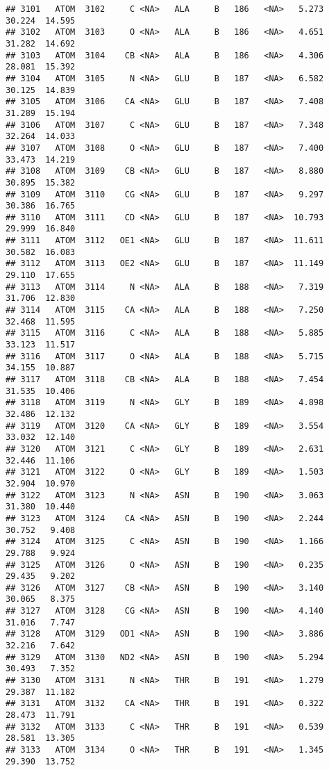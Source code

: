 \documentclass[
]{article}
\begin{document}
\begin{verbatim}
## 3101   ATOM  3102     C <NA>   ALA     B   186   <NA>   5.273  30.224  14.595
## 3102   ATOM  3103     O <NA>   ALA     B   186   <NA>   4.651  31.282  14.692
## 3103   ATOM  3104    CB <NA>   ALA     B   186   <NA>   4.306  28.081  15.392
## 3104   ATOM  3105     N <NA>   GLU     B   187   <NA>   6.582  30.125  14.839
## 3105   ATOM  3106    CA <NA>   GLU     B   187   <NA>   7.408  31.289  15.194
## 3106   ATOM  3107     C <NA>   GLU     B   187   <NA>   7.348  32.264  14.033
## 3107   ATOM  3108     O <NA>   GLU     B   187   <NA>   7.400  33.473  14.219
## 3108   ATOM  3109    CB <NA>   GLU     B   187   <NA>   8.880  30.895  15.382
## 3109   ATOM  3110    CG <NA>   GLU     B   187   <NA>   9.297  30.386  16.765
## 3110   ATOM  3111    CD <NA>   GLU     B   187   <NA>  10.793  29.999  16.840
## 3111   ATOM  3112   OE1 <NA>   GLU     B   187   <NA>  11.611  30.582  16.083
## 3112   ATOM  3113   OE2 <NA>   GLU     B   187   <NA>  11.149  29.110  17.655
## 3113   ATOM  3114     N <NA>   ALA     B   188   <NA>   7.319  31.706  12.830
## 3114   ATOM  3115    CA <NA>   ALA     B   188   <NA>   7.250  32.468  11.595
## 3115   ATOM  3116     C <NA>   ALA     B   188   <NA>   5.885  33.123  11.517
## 3116   ATOM  3117     O <NA>   ALA     B   188   <NA>   5.715  34.155  10.887
## 3117   ATOM  3118    CB <NA>   ALA     B   188   <NA>   7.454  31.535  10.406
## 3118   ATOM  3119     N <NA>   GLY     B   189   <NA>   4.898  32.486  12.132
## 3119   ATOM  3120    CA <NA>   GLY     B   189   <NA>   3.554  33.032  12.140
## 3120   ATOM  3121     C <NA>   GLY     B   189   <NA>   2.631  32.446  11.106
## 3121   ATOM  3122     O <NA>   GLY     B   189   <NA>   1.503  32.904  10.970
## 3122   ATOM  3123     N <NA>   ASN     B   190   <NA>   3.063  31.380  10.440
## 3123   ATOM  3124    CA <NA>   ASN     B   190   <NA>   2.244  30.752   9.408
## 3124   ATOM  3125     C <NA>   ASN     B   190   <NA>   1.166  29.788   9.924
## 3125   ATOM  3126     O <NA>   ASN     B   190   <NA>   0.235  29.435   9.202
## 3126   ATOM  3127    CB <NA>   ASN     B   190   <NA>   3.140  30.065   8.375
## 3127   ATOM  3128    CG <NA>   ASN     B   190   <NA>   4.140  31.016   7.747
## 3128   ATOM  3129   OD1 <NA>   ASN     B   190   <NA>   3.886  32.216   7.642
## 3129   ATOM  3130   ND2 <NA>   ASN     B   190   <NA>   5.294  30.493   7.352
## 3130   ATOM  3131     N <NA>   THR     B   191   <NA>   1.279  29.387  11.182
## 3131   ATOM  3132    CA <NA>   THR     B   191   <NA>   0.322  28.473  11.791
## 3132   ATOM  3133     C <NA>   THR     B   191   <NA>   0.539  28.581  13.305
## 3133   ATOM  3134     O <NA>   THR     B   191   <NA>   1.345  29.390  13.752

\end{verbatim}
\end{document}
